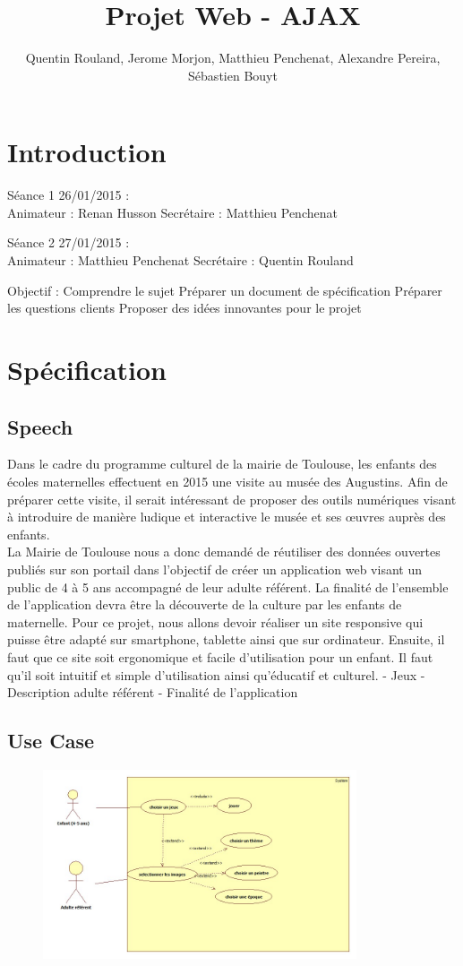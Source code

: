 \documentclass[12pt,a4paper]{report}
\author{Quentin Rouland, Jerome Morjon, Matthieu Penchenat, Alexandre Pereira, Sébastien Bouyt}
\affil{Université Toulouse, Jean Jaurès - L3 MIASHS \\ Document D1 : Specification Fonctionnelle}
\begin{document}
\title{Projet Web - AJAX}
\maketitle
\renewcommand{\contentsname}{Sommaire}
\tableofcontents
\chapter*{Introduction}
Séance 1 26/01/2015 : \\
Animateur : Renan Husson
Secrétaire : Matthieu Penchenat
\newline

Séance 2 27/01/2015 : \\
Animateur : Matthieu Penchenat
Secrétaire : Quentin Rouland
\newline

Objectif :
Comprendre le sujet
Préparer un document de spécification
Préparer les questions clients
Proposer des idées innovantes pour le projet
\chapter{Spécification}
\section{Speech}
Dans le cadre du programme culturel de la mairie de Toulouse, les enfants des écoles maternelles effectuent en 2015 une visite au musée des Augustins. Afin de préparer cette visite, il serait intéressant de proposer des outils numériques visant à introduire de manière ludique et interactive le musée et ses œuvres auprès des enfants.\\
La Mairie de Toulouse nous a donc demandé de réutiliser des données ouvertes publiés sur son portail dans l'objectif de créer un application web visant un public de 4 à 5 ans accompagné de leur adulte référent. La finalité de l'ensemble de l'application devra être la découverte de la culture par les enfants de maternelle.
Pour ce projet, nous allons devoir réaliser un site responsive qui puisse être adapté sur smartphone, tablette ainsi que sur ordinateur. Ensuite, il faut que ce site soit ergonomique et facile d'utilisation pour un enfant. Il faut qu'il soit intuitif et simple d'utilisation ainsi qu'éducatif et culturel.
- Jeux
- Description adulte référent
- Finalité de l'application
\section{Use Case}
\begin{figure}[!h]
\centering
\includegraphics[width=350px]{uml.jpg}
\end{figure}
\end{document}

